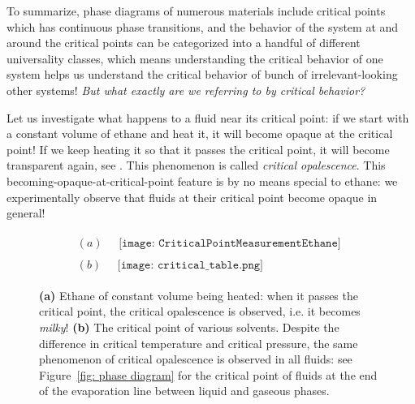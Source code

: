 To summarize, phase diagrams of numerous materials include critical points which has continuous phase transitions, and the behavior of the system at and around the critical points can be categorized into a handful of different universality classes, which means understanding the critical behavior of one system helps us understand the critical behavior of bunch of irrelevant-looking other systems! \emph{But what exactly are we referring to by critical behavior?}

Let us investigate what happens to a fluid near its critical point: if we start with a constant volume of ethane and heat it, it will become opaque at the critical point! If we keep heating it so that it passes the critical point, it will become transparent again, see \figref{\ref{fig: critical opalescense}}. This phenomenon is called \emph{critical opalescence}. This becoming-opaque-at-critical-point feature is by no means special to ethane: we experimentally observe that fluids at their critical point become opaque in general!

\begin{figure}[tp!]
	\centering 
	\begin{gather*}
		(a)\quad\begin{aligned}\texttt{[image: CriticalPointMeasurementEthane]}
		\end{aligned}\\
		(b)\quad\begin{aligned}\texttt{[image: critical\_table.png]}
		\end{aligned}
	\end{gather*}
	\caption[Critical opalescense]{\label{fig: critical opalescense}
		\textbf{(a)} Ethane of constant volume being heated: when it passes the critical point, the critical opalescence is observed, i.e. it becomes \emph{milky}! \textbf{(b)} The critical point of various solvents. Despite the difference in critical temperature and critical pressure, the same phenomenon of critical opalescence is observed in all fluids: see Figure~\ref{fig: phase diagram} for the critical point of fluids at the end of the evaporation line between liquid and gaseous phases.
	}
\end{figure}

